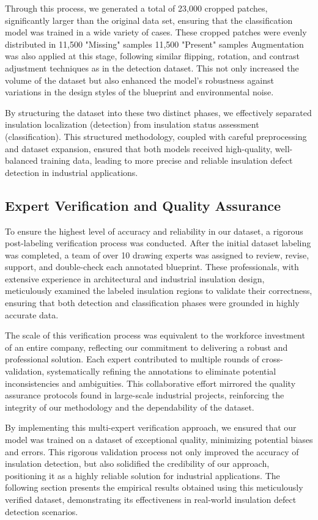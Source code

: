 \documentclass[]{IEEEphot}
\begin{document}
Through this process, we generated a total of 23,000 cropped patches, significantly larger than the original data set, ensuring that the classification model was trained in a wide variety of cases. These cropped patches were evenly distributed in 11,500 "Missing" samples 11,500 "Present" samples
Augmentation was also applied at this stage, following similar flipping, rotation, and contrast adjustment techniques as in the detection dataset. This not only increased the volume of the dataset but also enhanced the model's robustness against variations in the design styles of the blueprint and environmental noise.

By structuring the dataset into these two distinct phases, we effectively separated insulation localization (detection) from insulation status assessment (classification). This structured methodology, coupled with careful preprocessing and dataset expansion, ensured that both models received high-quality, well-balanced training data, leading to more precise and reliable insulation defect detection in industrial applications.

\subsection{Expert Verification and Quality Assurance}
To ensure the highest level of accuracy and reliability in our dataset, a rigorous post-labeling verification process was conducted. After the initial dataset labeling was completed, a team of over 10 drawing experts was assigned to review, revise, support, and double-check each annotated blueprint. These professionals, with extensive experience in architectural and industrial insulation design, meticulously examined the labeled insulation regions to validate their correctness, ensuring that both detection and classification phases were grounded in highly accurate data.

The scale of this verification process was equivalent to the workforce investment of an entire company, reflecting our commitment to delivering a robust and professional solution. Each expert contributed to multiple rounds of cross-validation, systematically refining the annotations to eliminate potential inconsistencies and ambiguities. This collaborative effort mirrored the quality assurance protocols found in large-scale industrial projects, reinforcing the integrity of our methodology and the dependability of the dataset.

By implementing this multi-expert verification approach, we ensured that our model was trained on a dataset of exceptional quality, minimizing potential biases and errors. This rigorous validation process not only improved the accuracy of insulation detection, but also solidified the credibility of our approach, positioning it as a highly reliable solution for industrial applications. The following section presents the empirical results obtained using this meticulously verified dataset, demonstrating its effectiveness in real-world insulation defect detection scenarios.
\end{document}

